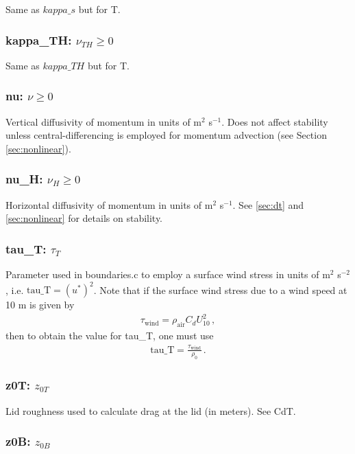 Same as $kappa\_s$ but for T.

\subsubsection{kappa\_TH: $\nu_{TH}\ge 0$}

Same as $kappa\_TH$ but for T.

\subsubsection{nu: $\nu\ge 0$}

Vertical diffusivity of momentum in units of m$^2$ s$^{-1}$.  Does not affect stability unless
central-differencing is employed for momentum advection (see Section \ref{sec:nonlinear}).

\subsubsection{nu\_H: $\nu_{H}\ge 0$}

Horizontal diffusivity of momentum in units of m$^2$ s$^{-1}$.  See \ref{sec:dt} and \ref{sec:nonlinear}
for details on stability.

\subsubsection{tau\_T: $\tau_T$}

Parameter used in boundaries.c to employ a surface wind stress in units of m$^2$ s$^{-2}$,
i.e. $\mbox{tau\_T}=(u^*)^2$.  Note that if the surface wind stress due to a wind speed at 10 m
is given by
\begin{eqnarray*}
\tau_{\mbox{wind}} = \rho_{\mbox{air}}C_d U_{10}^2\,,
\end{eqnarray*}
then to obtain the value for \mbox{tau\_T}, one must use
\begin{eqnarray*}
\mbox{tau\_T} = \frac{\tau_{\mbox{wind}}}{\rho_0}\,.
\end{eqnarray*}

\subsubsection{z0T: $z_{0T}$}

Lid roughness used to calculate drag at the lid (in meters).  See CdT.

\subsubsection{z0B: $z_{0B}$}

